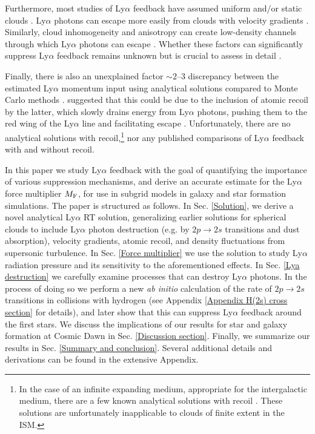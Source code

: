 \documentclass[fleqn,usenatbib]{mnras}
\begin{document}
Furthermore, most studies of Ly$\alpha$ feedback have assumed uniform and/or static clouds \citep[e.g.][]{Dijkstra2008, Smith2017, Kimm2018, Lao2020, Tomaselli2021}. Ly$\alpha$ photons can escape more easily from clouds with velocity gradients \citep{Bonilha1979, Seon2020}. Similarly, cloud inhomogeneity and anisotropy can create low-density channels through which Ly$\alpha$ photons can escape \citep[e.g.][]{Behrens2014, Zheng2014, Smith2019, Kakiichi2021, Monter2024, Yuan2024}. Whether these factors can significantly suppress Ly$\alpha$ feedback remains unknown but is crucial to assess in detail \citep[][]{Thomson2024}.

Finally, there is also an unexplained factor $\sim 2$--$3$ discrepancy between the estimated Ly$\alpha$ momentum input using analytical solutions \citep{Lao2020, Tomaselli2021} compared to Monte Carlo methods \citep{Kimm2018}. \cite{Tomaselli2021} suggested that this could be due to the inclusion of atomic recoil by the latter, which slowly drains energy from Ly$\alpha$ photons, pushing them to the red wing of the Ly$\alpha$ line and facilitating escape \citep{Adams1971, Smith2017}. Unfortunately, there are no analytical solutions with recoil,\footnote{In the case of an infinite expanding medium, appropriate for the intergalactic medium, there are a few known analytical solutions with recoil \citep[e.g.][]{Grachev1989, Chuzhoy2006, Furlanetto2006_FokkerPlanck}. These solutions are unfortunately inapplicable to clouds of finite extent in the ISM.} nor any published comparisons of Ly$\alpha$ feedback with and without recoil.

In this paper we study Ly$\alpha$ feedback with the goal of quantifying the importance of various suppression mechanisms, and derive an accurate estimate for the Ly$\alpha$ force multiplier $M_{\rm F}$, for use in subgrid models in galaxy and star formation simulations. The paper is structured as follows. In Sec. \ref{Solution}, we derive a novel analytical Ly$\alpha$ RT solution, generalizing earlier solutions for spherical clouds to include Ly$\alpha$ photon destruction (e.g. by $2p \rightarrow 2s$ transitions and dust absorption), velocity gradients, atomic recoil, and density fluctuations from supersonic turbulence. In Sec. \ref{Force multiplier} we use the solution to study Ly$\alpha$ radiation pressure and its sensitivity to the aforementioned effects. In Sec. \ref{Lya destruction} we carefully examine processes that can destroy Ly$\alpha$ photons. In the process of doing so we perform a new \textit{ab initio} calculation of the rate of $2p \rightarrow 2s$ transitions in collisions with hydrogen (see Appendix \ref{Appendix H(2s) cross section} for details), and later show that this can suppress Ly$\alpha$ feedback around the first stars. We discuss the implications of our results for star and galaxy formation at Cosmic Dawn in Sec. \ref{Discussion section}. Finally, we summarize our results in Sec. \ref{Summary and conclusion}. Several additional details and derivations can be found in the extensive Appendix.
\end{document}
